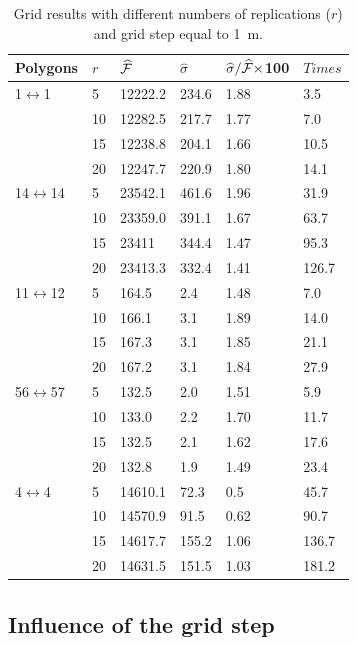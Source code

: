 \begin{table}
\footnotesize
\caption{\label{array:nr} Grid results  with different
  numbers of replications ($r$) and grid step equal to 1~m.}
\begin{center}
\begin{tabular}{|p{1.5cm}|p{1.5cm}|p{1.5cm}|p{1.5cm}|p{1.5cm}|p{1.2cm}|}
\hline
\textbf{Polygons} & 
$r$ & $\widehat{{\cal F}}$ &
$\widehat\sigma$ & $\widehat\sigma/\widehat{{\cal F}}\times$100  & $Times$
 \\ \hline
1$\leftrightarrow$1 & 5 & 12222.2  & 234.6 & 1.88 & 3.5\\
 & 10   & 12282.5  & 217.7 & 1.77 &  7.0 \\
 & 15 & 12238.8  &  204.1 & 1.66 & 10.5 \\
 & 20 &  12247.7  &  220.9 & 1.80 & 14.1
 \\ \hline
14$\leftrightarrow$14&  5 &  23542.1  & 461.6   & 1.96 & 31.9 \\
 &  10   &  23359.0   & 391.1 & 1.67 & 63.7\\
&  15 & 23411  &  344.4  & 1.47 & 95.3\\
& 20 &  23413.3  & 332.4 & 1.41 & 126.7
 \\ \hline
11$\leftrightarrow$12 &  5 & 164.5  & 2.4 & 1.48 & 7.0 \\
 &  10   & 166.1  & 3.1 & 1.89 & 14.0\\
&  15 & 167.3  & 3.1 & 1.85 & 21.1 \\
& 20 & 167.2  & 3.1 & 1.84 & 27.9
 \\ \hline
56$\leftrightarrow$57 &  5 & 132.5  & 2.0 & 1.51 & 5.9 \\
&  10   & 133.0  & 2.2 & 1.70 & 11.7\\
& 15 &  132.5  & 2.1 & 1.62 &  17.6\\
& 20 & 132.8  & 1.9 & 1.49 & 23.4
 \\ \hline
4$\leftrightarrow$4 &  5 & 14610.1  & 72.3 & 0.5 & 45.7 \\
 & 10   & 14570.9  & 91.5 & 0.62 & 90.7\\
&  15 & 14617.7  & 155.2 & 1.06 & 136.7\\
& 20 &14631.5  & 151.5 & 1.03 & 181.2
 \\ \hline
\end{tabular}
\end{center}
\normalsize
\end{table}



\subsection{Influence of the grid step}


